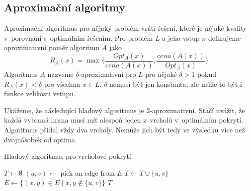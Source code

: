 \subsection{Aproximační algoritmy}

Aproximační algoritmus pro nějaký problém vrátí řešení, které je nějaké
kvality v~porovnání s~optimálním řešením.
Pro problém $L$ a jeho vstup $x$ definujeme aproximativní poměr
algoritmu $A$ jako
\[
    R_A(x) = \max \big \{ \frac{Opt_A(x)}{cena(A(x))},
    \frac{cena(A(x))}{Opt_A(x)} \big \}
\]
Algoritmus $A$ nazveme $\delta$-aproximativní pro $L$ pro
nějaké $\delta > 1$ pokud $R_A(x) < \delta$ pro všechna $x \in L$.
$\delta$ nemusí být jen konstanta, ale může to být i funkce velikosti
vstupu.

\begin{example}
Ukážeme, že následující hladový algoritmus je $2$-aproximativní.  Stačí
uvážit, že každá vybraná hrana musí mít alespoň jeden z~vrcholů
v~optimálním pokrytí. Algoritmus přidal vždy dva vrcholy. Nemůže jich
být tedy ve výsledku více než dvojnásobek od optima.

\begin{algorithm}
\caption{Hladový algoritmus pro vrcholové pokrytí}
\begin{algorithmic}[1]
    \State $T \gets \emptyset$
        \State $(u,v) \gets$ pick an edge from $E$
        \State $T \gets T \cup \{u,v\}$
        \State $E \gets \{ (x,y) \in E \mid x,y \not \in \{u, v\} \}$
    \EndWhile
    \State \Return $T$
\EndFunction
\end{algorithmic}
\end{algorithm}
\end{example}

